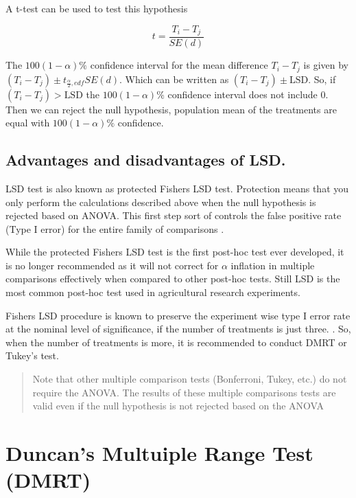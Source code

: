 \documentclass[
]{book}
\begin{document}
A t-test can be used to test this hypothesis

\[t = \frac{T_{i} - T_{j}}{SE(d)}\]

The \(100\left( 1 - \alpha \right)\%\) confidence interval for the mean difference \(T_{i} - T_{j}\) is given by
\(\left( T_{i} - T_{j} \right) \pm t_{\frac{\alpha}{2},edf}SE(d)\). Which
can be written as \(\left( T_{i} - T_{j} \right) \pm \text{LSD}\). So, if
\(\left( T_{i} - T_{j} \right) > \text{LSD}\) the
\(100\left( 1 - \alpha \right)\%\) confidence interval does not include 0.
Then we can reject the null hypothesis, population mean of the treatments are equal with \(100\left( 1 - \alpha \right)\%\) confidence.

\hypertarget{advantages-and-disadvantages-of-lsd.}{%
\subsection{Advantages and disadvantages of LSD.}\label{advantages-and-disadvantages-of-lsd.}}

LSD test is also known as protected Fisher\textquotesingle s LSD test. Protection means that you only perform the calculations described above when the null hypothesis is rejected based on ANOVA. This first step sort of controls the false positive rate (Type I error) for the entire family of
comparisons \citep{Hayter}.

While the protected Fisher\textquotesingle s LSD test is the first post-hoc test ever developed, it is no longer recommended as it will not correct for \(\alpha\) inflation in multiple comparisons effectively when compared to other post-hoc tests. Still LSD is the most common post-hoc
test used in agricultural research experiments.

Fisher\textquotesingle s LSD procedure is known to preserve the experiment wise type I error rate at the nominal level of significance, if the number of treatments is just three. \citep{Meier}. So, when the number of treatments is more, it is recommended to conduct DMRT or Tukey's test.

\begin{quote}
Note that other multiple comparison tests (Bonferroni, Tukey, etc.) do not require the ANOVA. The results of these multiple comparisons tests are valid even if the null hypothesis is not rejected based on the ANOVA
\end{quote}

\hypertarget{duncans-multuiple-range-test-dmrt}{%
\section{Duncan's Multuiple Range Test (DMRT)}\label{duncans-multuiple-range-test-dmrt}}
\end{document}

